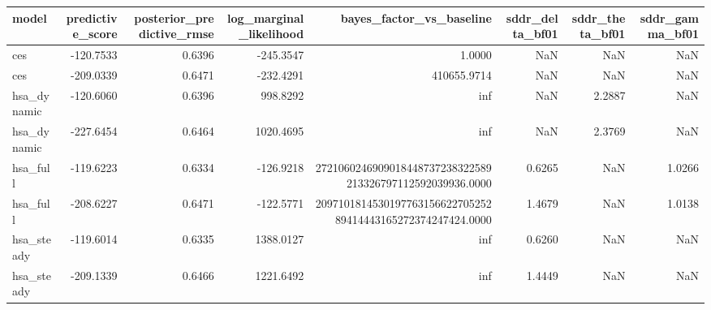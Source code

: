 \begin{tabular}{lrrrrrrr}
\toprule
model & predictive\_score & posterior\_predictive\_rmse & log\_marginal\_likelihood & bayes\_factor\_vs\_baseline & sddr\_delta\_bf01 & sddr\_theta\_bf01 & sddr\_gamma\_bf01 \\
\midrule
ces & -120.7533 & 0.6396 & -245.3547 & 1.0000 & NaN & NaN & NaN \\
ces & -209.0339 & 0.6471 & -232.4291 & 410655.9714 & NaN & NaN & NaN \\
hsa\_dynamic & -120.6060 & 0.6396 & 998.8292 & inf & NaN & 2.2887 & NaN \\
hsa\_dynamic & -227.6454 & 0.6464 & 1020.4695 & inf & NaN & 2.3769 & NaN \\
hsa\_full & -119.6223 & 0.6334 & -126.9218 & 2721060246909018448737238322589213326797112592039936.0000 & 0.6265 & NaN & 1.0266 \\
hsa\_full & -208.6227 & 0.6471 & -122.5771 & 209710181453019776315662270525289414443165272374247424.0000 & 1.4679 & NaN & 1.0138 \\
hsa\_steady & -119.6014 & 0.6335 & 1388.0127 & inf & 0.6260 & NaN & NaN \\
hsa\_steady & -209.1339 & 0.6466 & 1221.6492 & inf & 1.4449 & NaN & NaN \\
\bottomrule
\end{tabular}

